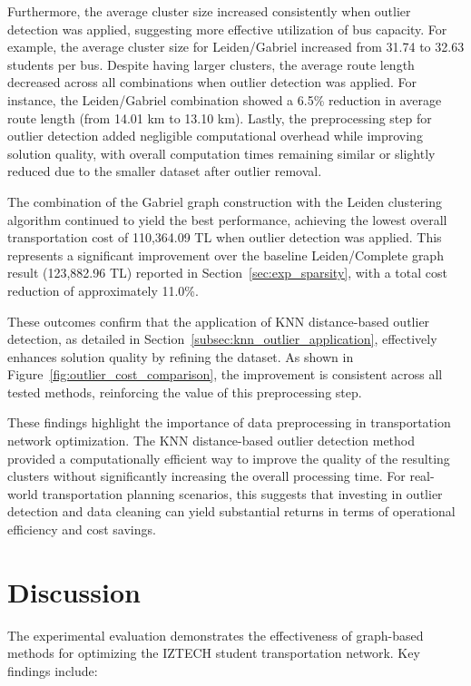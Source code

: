 Furthermore, the average cluster size increased consistently when outlier detection was applied, suggesting more effective utilization of bus capacity. For example, the average cluster size for Leiden/Gabriel increased from 31.74 to 32.63 students per bus. Despite having larger clusters, the average route length decreased across all combinations when outlier detection was applied. For instance, the Leiden/Gabriel combination showed a 6.5\% reduction in average route length (from 14.01 km to 13.10 km). Lastly, the preprocessing step for outlier detection added negligible computational overhead while improving solution quality, with overall computation times remaining similar or slightly reduced due to the smaller dataset after outlier removal.

The combination of the Gabriel graph construction with the Leiden clustering algorithm continued to yield the best performance, achieving the lowest overall transportation cost of 110,364.09 TL when outlier detection was applied. This represents a significant improvement over the baseline Leiden/Complete graph result (123,882.96 TL) reported in Section~\ref{sec:exp_sparsity}, with a total cost reduction of approximately 11.0\%.

These outcomes confirm that the application of KNN distance-based outlier detection, as detailed in Section~\ref{subsec:knn_outlier_application}, effectively enhances solution quality by refining the dataset. As shown in Figure~\ref{fig:outlier_cost_comparison}, the improvement is consistent across all tested methods, reinforcing the value of this preprocessing step.

These findings highlight the importance of data preprocessing in transportation network optimization. The KNN distance-based outlier detection method provided a computationally efficient way to improve the quality of the resulting clusters without significantly increasing the overall processing time. For real-world transportation planning scenarios, this suggests that investing in outlier detection and data cleaning can yield substantial returns in terms of operational efficiency and cost savings.

\section{Discussion}
\label{sec:discussion}

The experimental evaluation demonstrates the effectiveness of graph-based methods for optimizing the IZTECH student transportation network. Key findings include:

